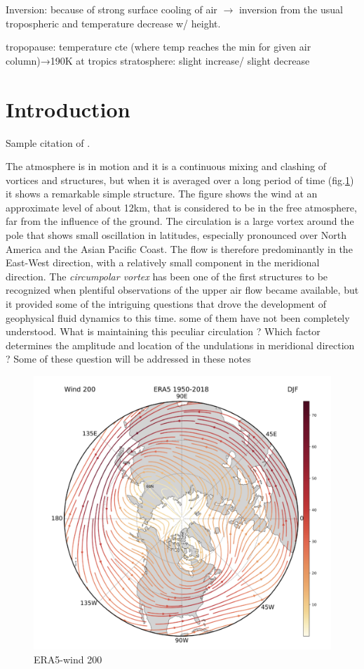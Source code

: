 Inversion: because of strong surface cooling of air $\rightarrow$ inversion from the usual tropospheric and temperature decrease w/ height.

tropopause: temperature cte (where temp reaches the min for given air column)→190K at tropics
stratosphere: slight increase/ slight decrease



\section{Introduction}\label{introduction}

Sample citation of \citet{Richardson1922}.

The atmosphere is in motion and it is a continuous mixing and clashing
of vortices and structures, but when it is averaged over a long period
of time (fig.{\ref{fig:ERA5-wind200}}) it shows a remarkable simple structure.
The figure shows the wind at an approximate level of about 12km, that is
considered to be in the free atmosphere, far from the influence of the
ground. The circulation is a large vortex around the pole that shows
small oscillation in latitudes, especially pronounced over North America
and the Asian Pacific Coast. The flow is therefore predominantly in the
East-West direction, with a relatively small component in the meridional
direction. The \emph{circumpolar vortex} has been one of the first
structures to be recognized when plentiful observations of the upper air
flow became available, but it provided some of the intriguing questions
that drove the development of geophysical fluid dynamics to this time.
some of them have not been completely understood. What is maintaining
this peculiar circulation ? Which factor determines the amplitude and
location of the undulations in meridional direction ? Some of these
question will be addressed in these notes

\begin{figure}[h!]
    \centering
    \includegraphics[width=0.5\linewidth]{uploads/Screenshot 2024-11-18 114256.png}
    \caption{ERA5-wind 200}
    \label{fig:ERA5-wind200}
\end{figure}


